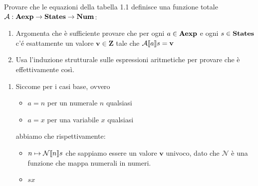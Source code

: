 {Provare che le equazioni della tabella 1.1 definisce una funzione totale $\mathcal{A}:\mbox{\textbf{Aexp}} \rightarrow \mbox{\textbf{States}} \rightarrow \mbox{\textbf{Num}}$: 
	\begin{enumerate}
		\item Argomenta che è sufficiente provare che per ogni $a \in \mbox{\textbf{Aexp}}$ e ogni $s \in \mbox{\textbf{States}}$
		c'é esattamente un valore $\mathbf{v} \in \mathbf{Z}$ tale che $\mathcal{A} \llbracket a \rrbracket s = \mathbf{v}$
		\item Usa l'induzione strutturale sulle espressioni aritmetiche per provare che è effettivamente
		così.
	\end{enumerate}
}
{
	\begin{enumerate}
		\item Siccome per i casi base, ovvero
		\begin{itemize}
			\item $\boxed{a = n}$ per un numerale $n$ qualsiasi
			\item $\boxed{a = x}$ per una variabile $x$ qualsiasi
		\end{itemize} 
		abbiamo che rispettivamente:
		\begin{itemize}
			\item $n \mapsto \mathcal{N} \llbracket n \rrbracket s$ che sappiamo essere un valore $\mathbf{v}$ univoco, dato che $\mathcal{N}$ è una funzione che mappa numerali in numeri.
			\item $s  x$
			\N
			
		\end{itemize}
	\end{enumerate}
}
